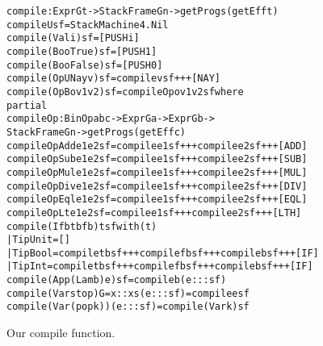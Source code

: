 \begin{figure}
\begin{alltt}
compile : Expr G t -> StackFrame G n -> getProg s (getEff t)
compile U                 sf    = StackMachine4.Nil
compile (Val i)           sf    = [PUSH i]
compile (Boo True)        sf    = [PUSH 1]
compile (Boo False)       sf    = [PUSH 0]
compile (OpU Nay v)       sf    = compile v sf +++ [NAY]
compile (OpB o v1 v2) sf = compileOp o v1 v2 sf where
  partial 
  compileOp : BinOp a b c -> Expr G a -> Expr G b -> 
                StackFrame G n -> getProg s (getEff c)
  compileOp Add e1 e2 sf = compile e1 sf +++ compile e2 sf +++ [ADD]
  compileOp Sub e1 e2 sf = compile e1 sf +++ compile e2 sf +++ [SUB]
  compileOp Mul e1 e2 sf = compile e1 sf +++ compile e2 sf +++ [MUL]
  compileOp Div e1 e2 sf = compile e1 sf +++ compile e2 sf +++ [DIV]
  compileOp Eql e1 e2 sf = compile e1 sf +++ compile e2 sf +++ [EQL]
  compileOp Lt  e1 e2 sf = compile e1 sf +++ compile e2 sf +++ [LTH]
compile (If b tb fb) {t} sf with (t)
  | TipUnit = []
  | TipBool = compile tb sf +++ compile fb sf +++ compile b  sf +++ [IF]
  | TipInt  = compile tb sf +++ compile fb sf +++ compile b  sf +++ [IF]
compile (App (Lam b) e) sf = compile b (e ::: sf)
compile (Var stop) {G = x :: xs} (e ::: sf) = compile e sf
compile (Var (pop k)) (e ::: sf) = compile (Var k) sf
\end{alltt}
\label{fig:compile_function}
\caption{Our compile function.}
\end{figure}